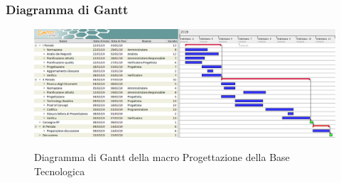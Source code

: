         \begin{landscape}
			\subsubsection{Diagramma di Gantt}        
			\begin{figure}[H]
					\centering
					\includegraphics[scale=0.49]{img/Progettazione_della_base_tecnologica.png}\\
					\caption{Diagramma di Gantt della macro Progettazione della Base Tecnologica}
			\end{figure}
		\end{landscape}
		\newpage


